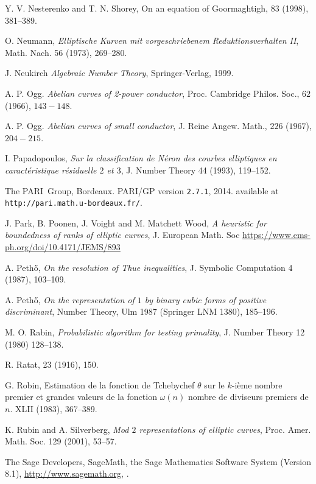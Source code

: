\begin{thebibliography}{}
Y. V. Nesterenko and T. N. Shorey,
\newblock On an equation of Goormaghtigh,
 83 (1998), 381--389.

O. Neumann,
\emph{Elliptische Kurven mit vorgeschriebenem Reduktionsverhalten II},
Math. Nach. 56 (1973), 269--280.

J. Neukirch
\emph{Algebraic Number Theory},
Springer-Verlag, 1999.

A. P. Ogg. 
\emph{Abelian curves of 2-power conductor},
Proc. Cambridge Philos. Soc., $62$ ($1966$), $143-148$.

A. P. Ogg. 
\emph{Abelian curves of small conductor},
J. Reine Angew. Math., $226$ ($1967$), $204-215$.

I. Papadopoulos,
\emph{Sur la classification de N\'eron des courbes elliptiques  
en caract\'eristique r\'esiduelle $2$ et $3$}, 
J. Number Theory 44 (1993), 119--152.

The PARI~Group, Bordeaux.
PARI/GP version {\tt 2.7.1}, 2014.
available at {\tt http://pari.math.u-bordeaux.fr/}.

J. Park, B. Poonen, J. Voight and M. Matchett Wood,
\emph{A heuristic for boundedness of ranks of elliptic curves},
J. European Math. Soc \url{https://www.ems-ph.org/doi/10.4171/JEMS/893}

A. Peth\H{o},
\emph{On the resolution of Thue inequalities},
J. Symbolic Computation 4 (1987), 103--109.

A. Peth\H{o},
\emph{On the representation of $1$ by binary cubic forms of positive discriminant},
Number Theory, Ulm 1987 (Springer LNM 1380), 185--196.

M. O. Rabin, 
 \emph{Probabilistic algorithm for testing primality}, J.
Number Theory 12 (1980) 128--138.

R. Ratat,
 23 (1916), 150.

G. Robin,
\newblock Estimation de la fonction de Tchebychef $\theta$ sur le $k$-i\`eme nombre premier et grandes valeurs de la fonction $\omega (n)$ nombre de diviseurs premiers de $n$.
 XLII (1983), 367--389.

K. Rubin and A. Silverberg,
\emph{Mod $2$ representations of elliptic curves}, Proc. Amer. Math. Soc. 129 (2001), 53--57.

The Sage Developers,
\newblock SageMath, the Sage Mathematics Software System (Version 8.1),
 \newblock \url{http://www.sagemath.org},
.


\end{thebibliography}
